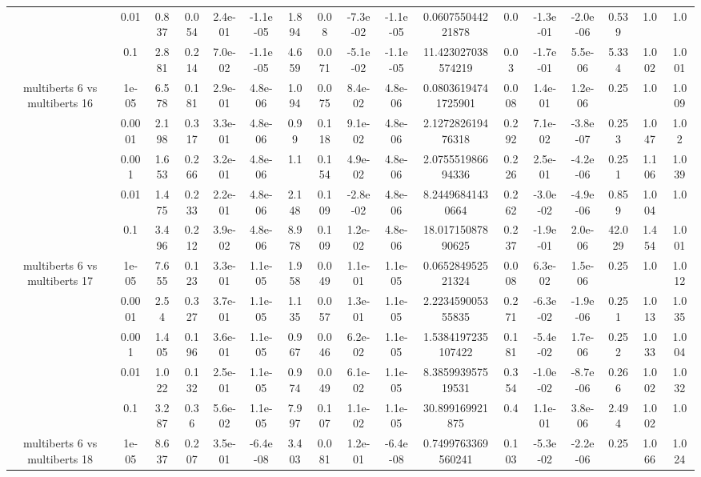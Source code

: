 \begin{tabular}{|c|c|c|c|c|c|c|c|c|c|c|c|c|c|c|c|c|}
 & 0.01 & 0.837 & 0.054 & 2.4e-01 & -1.1e-05 & 1.894 & 0.08 & -7.3e-02 & -1.1e-05 & 0.060755044221878 & 0.0 & -1.3e-01 & -2.0e-06 & 0.539 & 1.0 & 1.0 \\
 & 0.1 & 2.881 & 0.214 & 7.0e-02 & -1.1e-05 & 4.659 & 0.071 & -5.1e-02 & -1.1e-05 & 11.423027038574219 & 0.03 & -1.7e-01 & 5.5e-06 & 5.334 & 1.002 & 1.001 \\
\hline
\multirow{5}{*}{multiberts 6 vs multiberts 16} & 1e-05 & 6.578 & 0.181 & 2.9e-01 & 4.8e-06 & 1.094 & 0.075 & 8.4e-02 & 4.8e-06 & 0.08036194741725901 & 0.008 & 1.4e-01 & 1.2e-06 & 0.25 & 1.0 & 1.009 \\
 & 0.0001 & 2.198 & 0.317 & 3.3e-01 & 4.8e-06 & 0.99 & 0.118 & 9.1e-02 & 4.8e-06 & 2.127282619476318 & 0.292 & 7.1e-02 & -3.8e-07 & 0.253 & 1.047 & 1.02 \\
 & 0.001 & 1.653 & 0.266 & 3.2e-01 & 4.8e-06 & 1.1 & 0.154 & 4.9e-02 & 4.8e-06 & 2.075551986694336 & 0.226 & 2.5e-01 & -4.2e-06 & 0.251 & 1.106 & 1.039 \\
 & 0.01 & 1.475 & 0.233 & 2.2e-01 & 4.8e-06 & 2.148 & 0.109 & -2.8e-02 & 4.8e-06 & 8.24496841430664 & 0.262 & -3.0e-02 & -4.9e-06 & 0.859 & 1.004 & 1.0 \\
 & 0.1 & 3.496 & 0.212 & 3.9e-02 & 4.8e-06 & 8.978 & 0.109 & 1.2e-02 & 4.8e-06 & 18.01715087890625 & 0.237 & -1.9e-01 & 2.0e-06 & 42.029 & 1.454 & 1.001 \\
\hline
\multirow{5}{*}{multiberts 6 vs multiberts 17} & 1e-05 & 7.655 & 0.123 & 3.3e-01 & 1.1e-05 & 1.958 & 0.049 & 1.1e-01 & 1.1e-05 & 0.065284952521324 & 0.008 & 6.3e-02 & 1.5e-06 & 0.25 & 1.0 & 1.012 \\
 & 0.0001 & 2.54 & 0.327 & 3.7e-01 & 1.1e-05 & 1.135 & 0.057 & 1.3e-01 & 1.1e-05 & 2.223459005355835 & 0.271 & -6.3e-02 & -1.9e-06 & 0.251 & 1.013 & 1.035 \\
 & 0.001 & 1.405 & 0.196 & 3.6e-01 & 1.1e-05 & 0.967 & 0.046 & 6.2e-02 & 1.1e-05 & 1.5384197235107422 & 0.181 & -5.4e-02 & 1.7e-06 & 0.252 & 1.033 & 1.004 \\
 & 0.01 & 1.022 & 0.132 & 2.5e-01 & 1.1e-05 & 0.974 & 0.049 & 6.1e-02 & 1.1e-05 & 8.385993957519531 & 0.354 & -1.0e-02 & -8.7e-06 & 0.266 & 1.002 & 1.032 \\
 & 0.1 & 3.287 & 0.36 & 5.6e-02 & 1.1e-05 & 7.997 & 0.107 & 1.1e-02 & 1.1e-05 & 30.899169921875 & 0.4 & 1.1e-01 & 3.8e-06 & 2.494 & 1.002 & 1.0 \\
\hline
\multirow{5}{*}{multiberts 6 vs multiberts 18} & 1e-05 & 8.637 & 0.207 & 3.5e-01 & -6.4e-08 & 3.403 & 0.081 & 1.2e-01 & -6.4e-08 & 0.7499763369560241 & 0.103 & -5.3e-02 & -2.2e-06 & 0.25 & 1.066 & 1.024 \\

\end{tabular}

